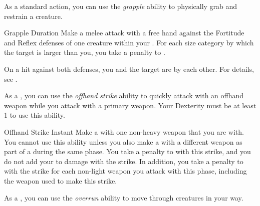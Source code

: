          As a standard action, you can use the \textit{grapple} ability to physically grab and restrain a creature.

        \begin{durationability}{Grapple}\label{Grapple}
            Duration
            \rankline
            Make a melee attack with a free hand against the Fortitude and Reflex defenses of one creature within your .
            For each size category by which the target is larger than you, you take a  penalty to .

            On a hit against both defenses, you and the target are \grappled by each other.
            For details, see .
        \end{durationability}

        \label{Offhand Strike} As a , you can use the \textit{offhand strike} ability to quickly attack with an offhand weapon while you attack with a primary weapon.
        Your Dexterity must be at least 1 to use this ability.
        \begin{instantability}{Offhand Strike}
            Instant
            \rankline
            Make a  with one non-heavy weapon that you are  with.
            You cannot use this ability unless you also make a  with a different weapon as part of a  during the same phase.
            You take a  penalty to  with this strike, and you do not add your  to damage with the strike.
            In addition, you take a  penalty to  with the strike for each non-light weapon you attack with this phase, including the weapon used to make this strike.
        \end{instantability}

         As a , you can use the \textit{overrun} ability to move through creatures in your way.

